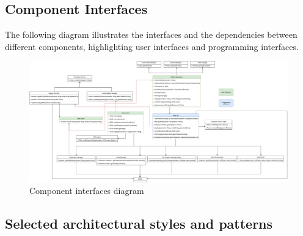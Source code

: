 \documentclass{article}
\begin{document}
	\subsection{Component Interfaces}
	The following diagram illustrates the interfaces and the dependencies between different components, highlighting user interfaces and programming interfaces.
		\begin{figure}[H]
			\includegraphics[width=\linewidth]{images/Interface_diagram.png}
			\caption{Component interfaces diagram}
		\end{figure}
	\subsection{Selected architectural styles and patterns} \label{sec:Patterns}
\end{document}
